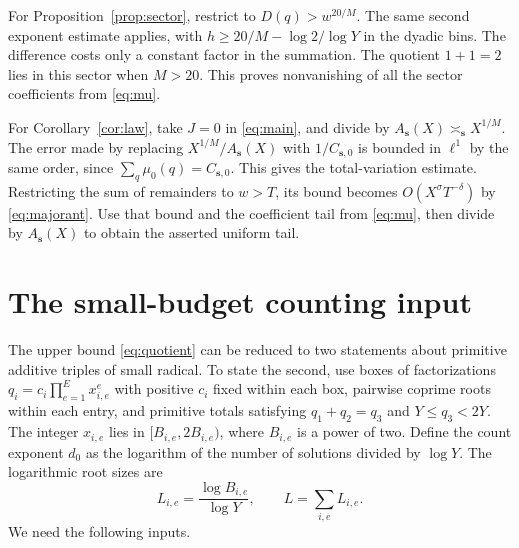 \documentclass[11pt,reqno]{amsart}
\newcommand{\sord}{\boldsymbol{s}}
\begin{document}
For Proposition~\ref{prop:sector}, restrict to \(D(q)>w^{20/M}\).
The same second exponent estimate applies, with
\(h\ge20/M-\log 2/\log Y\) in the dyadic bins. The difference costs
only a constant factor in the summation. The quotient \(1+1=2\) lies
in this sector when \(M>20\). This proves nonvanishing of all the
sector coefficients from \eqref{eq:mu}.

For Corollary~\ref{cor:law}, take \(J=0\) in \eqref{eq:main}, and divide
by \(A_{\sord}(X)\asymp_{\sord}X^{1/M}\). The error made by replacing
\(X^{1/M}/A_{\sord}(X)\) with \(1/C_{\sord,0}\) is bounded in
\(\ell^1\) by the same order, since \(\sum_q\mu_0(q)=C_{\sord,0}\).
This gives the total-variation estimate. Restricting the sum of
remainders to \(w>T\), its bound becomes \(O(X^\sigma T^{-\delta})\)
by \eqref{eq:majorant}. Use that bound and the coefficient tail from
\eqref{eq:mu}, then divide by \(A_{\sord}(X)\) to obtain the asserted
uniform tail.

\section{The small-budget counting input}\label{sec:endpoint}

The upper bound \eqref{eq:quotient} can be reduced to two statements about
primitive additive triples of small radical. To state the second, use
boxes of factorizations \(q_i=c_i\prod_{e=1}^E x_{i,e}^e\) with positive
\(c_i\) fixed within each box, pairwise coprime roots within each entry, and primitive
totals satisfying \(q_1+q_2=q_3\) and \(Y\le q_3<2Y\). The integer
\(x_{i,e}\) lies in \([B_{i,e},2B_{i,e})\), where \(B_{i,e}\) is a power
of two. Define the count exponent \(d_0\) as the logarithm of the number of
solutions divided by \(\log Y\). The logarithmic root sizes are
\[
 L_{i,e}=\frac{\log B_{i,e}}{\log Y},\qquad L=\sum_{i,e}L_{i,e}.
\]
We need the following inputs.
\end{document}
